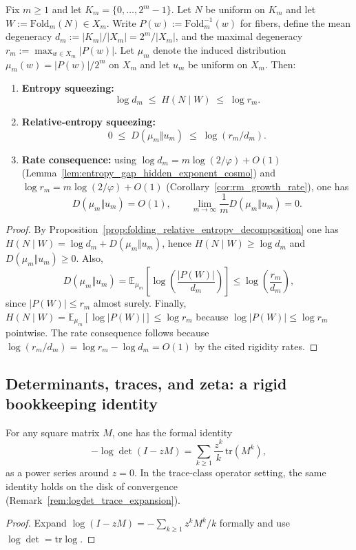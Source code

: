 \begin{proposition}\label{prop:fiber_entropy_relative_entropy_squeezing}
\MathTag Fix $m\ge 1$ and let $K_m=\{0,\dots,2^m-1\}$.
Let $N$ be uniform on $K_m$ and let $W:=\mathrm{Fold}_m(N)\in X_m$.
Write $P(w):=\mathrm{Fold}_m^{-1}(w)$ for fibers, define the mean degeneracy $d_m:=|K_m|/|X_m|=2^m/|X_m|$, and the maximal degeneracy $r_m:=\max_{w\in X_m}|P(w)|$.
Let $\mu_m$ denote the induced distribution $\mu_m(w)=|P(w)|/2^m$ on $X_m$ and let $u_m$ be uniform on $X_m$.
Then:
\begin{enumerate}
\item \textbf{Entropy squeezing:}
\[
\log d_m \;\le\; H(N\mid W) \;\le\; \log r_m.
\]
\item \textbf{Relative-entropy squeezing:}
\[
0\;\le\; D(\mu_m\Vert u_m)\;\le\;\log(r_m/d_m).
\]
\item \textbf{Rate consequence:} using $\log d_m=m\log(2/\varphi)+O(1)$ (Lemma~\ref{lem:entropy_gap_hidden_exponent_cosmo}) and $\log r_m=m\log(2/\varphi)+O(1)$ (Corollary~\ref{cor:rm_growth_rate}), one has
\[
D(\mu_m\Vert u_m)=O(1),
\qquad
\lim_{m\to\infty}\frac{1}{m}D(\mu_m\Vert u_m)=0.
\]
\end{enumerate}
\end{proposition}
\begin{proof}
By Proposition~\ref{prop:folding_relative_entropy_decomposition} one has $H(N\mid W)=\log d_m + D(\mu_m\Vert u_m)$, hence $H(N\mid W)\ge \log d_m$ and $D(\mu_m\Vert u_m)\ge 0$.
Also,
\[
D(\mu_m\Vert u_m)=\mathbb{E}_{\mu_m}\!\left[\log\!\left(\frac{|P(W)|}{d_m}\right)\right]
\le \log\!\left(\frac{r_m}{d_m}\right),
\]
since $|P(W)|\le r_m$ almost surely.
Finally, $H(N\mid W)=\mathbb{E}_{\mu_m}[\log|P(W)|]\le \log r_m$ because $\log|P(W)|\le \log r_m$ pointwise.
The rate consequence follows because $\log(r_m/d_m)=\log r_m-\log d_m=O(1)$ by the cited rigidity rates.
\end{proof}

\subsection{Determinants, traces, and zeta: a rigid bookkeeping identity}
\label{subsec:rigidity_det_trace_zeta}

\begin{lemma}\label{lem:rigidity_logdet_trace_series}
\MathTag For any square matrix $M$, one has the formal identity
\[
-\log\det(I-zM)=\sum_{k\ge 1}\frac{z^k}{k}\,\mathrm{tr}(M^k),
\]
as a power series around $z=0$.
In the trace-class operator setting, the same identity holds on the disk of convergence (Remark~\ref{rem:logdet_trace_expansion}).
\end{lemma}
\begin{proof}
Expand $\log(I-zM)=-\sum_{k\ge 1} z^k M^k/k$ formally and use $\log\det=\mathrm{tr}\log$.
\end{proof}

